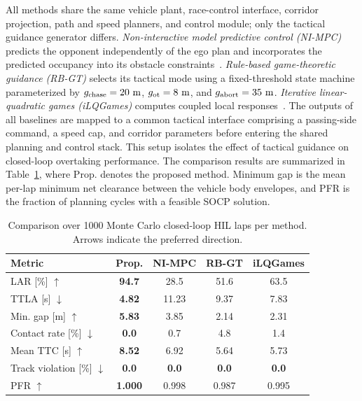 \documentclass[sensors,article,submit,moreauthors]{Definitions/mdpi}
\begin{document}
All methods share the same vehicle plant, race-control interface, corridor
projection, path and speed planners, and control module; only the tactical
guidance generator differs. \emph{Non-interactive model predictive control
(NI-MPC)} predicts the opponent
independently of the ego plan and incorporates the predicted occupancy into its
obstacle constraints~\cite{kabzan2020amzracing,betz2023autonomous}.
\emph{Rule-based game-theoretic guidance (RB-GT)} selects its tactical mode
using a fixed-threshold state machine parameterized by
\(g_{\rm chase}=20~\mathrm{m}\),
\(g_{\rm ot}=8~\mathrm{m}\), and \(g_{\rm abort}=35~\mathrm{m}\).
\emph{Iterative linear-quadratic games (iLQGames)} computes coupled local
responses~\cite{fridovich2020ilqgames}. The outputs
of all baselines are mapped to a common tactical interface comprising a
passing-side command, a speed cap, and corridor parameters before entering the
shared planning and control stack. This setup isolates the effect of tactical
guidance on closed-loop overtaking performance. The comparison results are
summarized in Table~\ref{tab:comparison}, where Prop. denotes the proposed
method. Minimum gap is the mean per-lap
minimum net clearance between the vehicle body envelopes, and PFR is the
fraction of planning cycles with a feasible SOCP solution.

\begin{table}[!htbp]
\centering
\footnotesize
\setlength{\tabcolsep}{2.3pt}
\renewcommand{\arraystretch}{1.08}
\caption{Comparison over 1000 Monte Carlo closed-loop HIL laps per method.
Arrows indicate the preferred direction.}
\label{tab:comparison}
\begin{tabular}{@{}lcccc@{}}
\toprule
Metric & Prop. & NI-MPC & RB-GT & iLQGames \\
\midrule
LAR [\%] $\uparrow$
& \textbf{94.7} & 28.5 & 51.6 & 63.5 \\
TTLA [s] $\downarrow$
& \textbf{4.82} & 11.23 & 9.37 & 7.83 \\
Min. gap [m] $\uparrow$
& \textbf{5.83} & 3.85 & 2.14 & 2.31 \\
Contact rate [\%] $\downarrow$
& \textbf{0.0} & 0.7 & 4.8 & 1.4 \\
Mean TTC [s] $\uparrow$
& \textbf{8.52} & 6.92 & 5.64 & 5.73 \\
Track violation [\%] $\downarrow$
& \textbf{0.0} & \textbf{0.0} & \textbf{0.0} & \textbf{0.0} \\
PFR $\uparrow$
& \textbf{1.000} & 0.998 & 0.987 & 0.995 \\
\bottomrule
\end{tabular}
\end{table}
\end{document}
